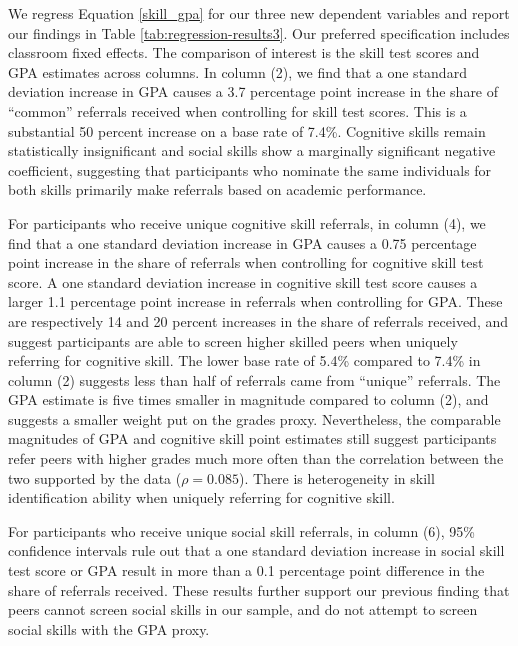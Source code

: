 \documentclass[11pt,a4paper,oneside]{article}
\begin{document}
We regress Equation \ref{skill_gpa} for our three new dependent variables and report our findings in Table \ref{tab:regression-results3}. Our preferred specification includes classroom fixed effects. The comparison of interest is the skill test scores and GPA estimates across columns. In column (2), we find that a one standard deviation increase in GPA causes a 3.7 percentage point increase in the share of ``common'' referrals received when controlling for skill test scores. This is a substantial 50 percent increase on a base rate of 7.4\%. Cognitive skills remain statistically insignificant and social skills show a marginally significant negative coefficient, suggesting that participants who nominate the same individuals for both skills primarily make referrals based on academic performance.

For participants who receive unique cognitive skill referrals, in column (4), we find that a one standard deviation increase in GPA causes a 0.75 percentage point increase in the share of referrals when controlling for cognitive skill test score. A one standard deviation increase in cognitive skill test score causes a larger 1.1 percentage point increase in referrals when controlling for GPA. These are respectively 14 and 20 percent increases in the share of referrals received, and suggest participants are able to screen higher skilled peers when uniquely referring for cognitive skill. The lower base rate of 5.4\% compared to 7.4\% in column (2) suggests less than half of referrals came from ``unique'' referrals. The GPA estimate is five times smaller in magnitude compared to column (2), and suggests a smaller weight put on the grades proxy. Nevertheless, the comparable magnitudes of GPA and cognitive skill point estimates still suggest participants refer peers with higher grades much more often than the correlation between the two supported by the data ($\rho = 0.085$). There is heterogeneity in skill identification ability when uniquely referring for cognitive skill.

For participants who receive unique social skill referrals, in column (6), 95\% confidence intervals rule out that a one standard deviation increase in social skill test score or GPA result in more than a 0.1 percentage point difference in the share of referrals received. These results further support our previous finding that peers cannot screen social skills in our sample, and do not attempt to screen social skills with the GPA proxy.

\begin{result}
\end{result}
\end{document}
